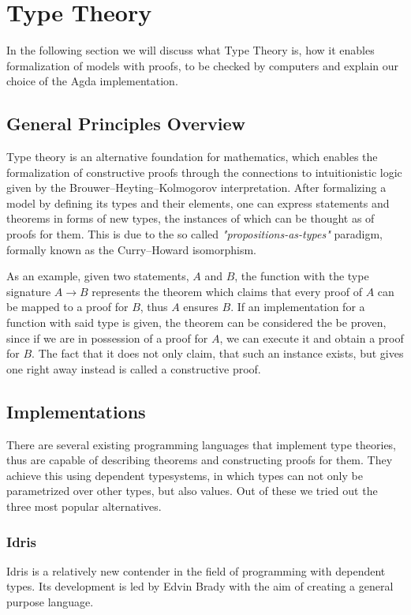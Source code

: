 \section{Type Theory}
In the following section we will discuss what Type Theory is, how it enables formalization of models with proofs, to be checked by computers and explain our choice of the Agda implementation.

\subsection{General Principles Overview}

Type theory is an alternative foundation for mathematics, which enables the formalization of constructive proofs through the connections to intuitionistic logic given by the Brouwer–Heyting–Kolmogorov interpretation. After formalizing a model by defining its types and their elements, one can express statements and theorems in forms of new types, the instances of which can be thought as of proofs for them.
This is due to the so called \textit{"propositions-as-types"} paradigm, formally known as the Curry–Howard isomorphism.

As an example, given two statements, $A$ and $B$, the function with the type signature $A \to B$ represents the theorem which claims that every proof of $A$ can be mapped to a proof for $B$, thus $A$ ensures $B$. If an implementation for a function with said type is given, the theorem can be considered the be proven, since if we are in possession of a proof for $A$, we can execute it and obtain a proof for $B$. The fact that it does not only claim, that such an instance exists, but gives one right away instead is called a constructive proof.

\subsection{Implementations}
There are several existing programming languages that implement type theories, thus are capable of describing theorems and constructing proofs for them. They achieve this using dependent typesystems, in which types can not only be parametrized over other types, but also values. Out of these we tried out the three most popular alternatives.

\subsubsection{Idris}
Idris\cite{Brady2013IdrisAG} is a relatively new contender in the field of programming with dependent types. Its development is led by Edvin Brady with the aim of creating a general purpose language.

